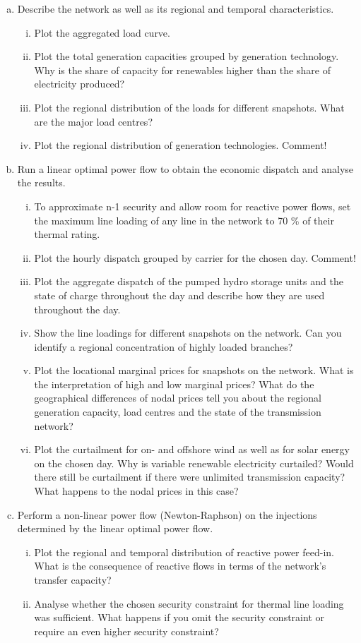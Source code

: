 \documentclass[11pt,a4paper,fleqn]{scrartcl}
\begin{document}
\begin{enumerate}[(a)]
	\item Describe the network as well as its regional and temporal characteristics.
	\begin{enumerate}[(i)]
		\item Plot the aggregated load curve.
		\item Plot the total generation capacities grouped by generation technology. Why is the share of capacity for renewables higher than the share of electricity produced?
		\item Plot the regional distribution of the loads for different snapshots. What are the major load centres?
		\item Plot the regional distribution of generation technologies. Comment!
	\end{enumerate}
	\item Run a linear optimal power flow to obtain the economic dispatch and analyse the results.
	\begin{enumerate}[(i)]
		\item To approximate n-1 security and allow room for reactive power flows, set the maximum line loading of any line in the network to 70 \% of their thermal rating.
		\item Plot the hourly dispatch grouped by carrier for the chosen day. Comment!
		\item Plot the aggregate dispatch of the pumped hydro storage units and the state of charge throughout the day and describe how they are used throughout the day.
		\item Show the line loadings for different snapshots on the network. Can you identify a regional concentration of highly loaded branches?
		\item Plot the locational marginal prices for snapshots on the network. What is the interpretation of high and low marginal prices? What do the geographical differences of nodal prices tell you about the regional generation capacity, load centres and the state of the transmission network?
		\item Plot the curtailment for on- and offshore wind as well as for solar energy on the chosen day. Why is variable renewable electricity curtailed?  Would there still be curtailment if there were unlimited transmission capacity? What happens to the nodal prices in this case?
	\end{enumerate}
	\item Perform a non-linear power flow (Newton-Raphson) on the injections determined by the linear optimal power flow.
	\begin{enumerate}[(i)]
		\item Plot the regional and temporal distribution of reactive power feed-in. What is the consequence of reactive flows in terms of the network's transfer capacity?
		\item Analyse whether the chosen security constraint for thermal line loading  was sufficient. What happens if you omit the security constraint or require an even higher security constraint?
	\end{enumerate}
\end{enumerate}
\end{document}
